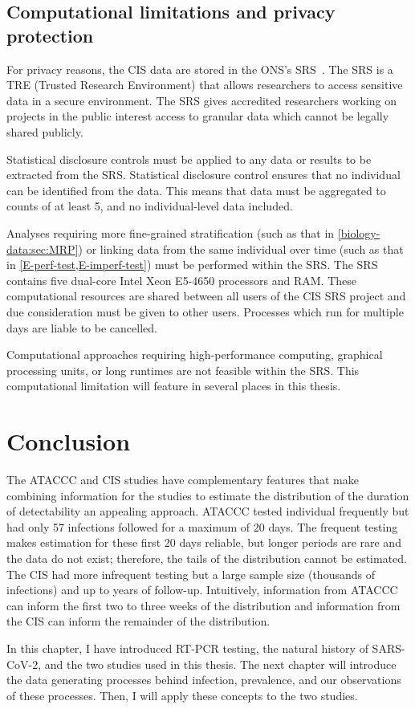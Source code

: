 \documentclass[thesis.tex]{subfiles}
\begin{document}
\subsection{Computational limitations and privacy protection} \label{biology-data:sec:SRS}

For privacy reasons, the CIS data are stored in the ONS's SRS~\autocite{onsSRS}.
The SRS is a TRE (Trusted Research Environment) that allows researchers to access sensitive data in a secure environment.
The SRS gives accredited researchers working on projects in the public interest access to granular data which cannot be legally shared publicly.

Statistical disclosure controls must be applied to any data or results to be extracted from the SRS.
Statistical disclosure control ensures that no individual can be identified from the data.
This means that data must be aggregated to counts of at least 5, and no individual-level data included.

Analyses requiring more fine-grained stratification (such as that in \cref{biology-data:sec:MRP}) or linking data from the same individual over time (such as that in \cref{E-perf-test,E-imperf-test}) must be performed within the SRS.
The SRS contains five  dual-core Intel Xeon E5-4650 processors and  RAM.
These computational resources are shared between all users of the CIS SRS project and due consideration must be given to other users.
Processes which run for multiple days are liable to be cancelled.

Computational approaches requiring high-performance computing, graphical processing units, or long runtimes are not feasible within the SRS.
This computational limitation will feature in several places in this thesis.

\section{Conclusion}

The ATACCC and CIS studies have complementary features that make combining information for the studies to estimate the distribution of the duration of detectability an appealing approach.
ATACCC tested individual frequently but had only 57 infections followed for a maximum of 20 days.
The frequent testing makes estimation for these first 20 days reliable, but longer periods are rare and the data do not exist; therefore, the tails of the distribution cannot be estimated.
The CIS had more infrequent testing but a large sample size (thousands of infections) and up to years of follow-up.
Intuitively, information from ATACCC can inform the first two to three weeks of the distribution and information from the CIS can inform the remainder of the distribution.

In this chapter, I have introduced RT-PCR testing, the natural history of SARS-CoV-2, and the two studies used in this thesis.
The next chapter will introduce the data generating processes behind infection, prevalence, and our observations of these processes.
Then, I will apply these concepts to the two studies.


\ifSubfilesClassLoaded{
  \listoftodos
}{}
\end{document}
